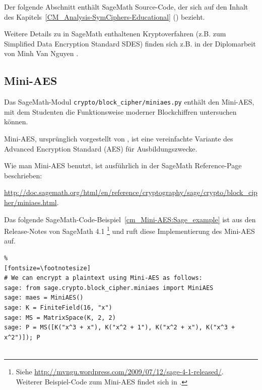 \begin{refsegment}
\noindent Der folgende Abschnitt enthält SageMath Source-Code, der sich auf den
Inhalt des Kapitels~\ref{CM_Analysis-SymCiphers-Educational}
(\glqq {}\grqq) bezieht.

Weitere Details zu in SageMath enthaltenen Kryptoverfahren (z.B. zum Simplified
Data Encryption Standard SDES) finden sich z.B. in der Diplomarbeit von Minh Van
Nguyen \cite{Nguyen2009b}.

\subsection{Mini-AES}
\label{CM_Sage_Mini-AES}

Das SageMath-Modul \texttt{crypto/block\_cipher/miniaes.py} enthält den Mini-AES, mit
dem Studenten die Funktionsweise moderner Blockchiffren untersuchen können.

Mini-AES, ursprünglich vorgestellt von \cite{Phan2002}, ist eine vereinfachte
Variante des Advanced Encryption Standard (AES) für Ausbildungszwecke.

Wie man Mini-AES benutzt, ist ausführlich in der SageMath Reference-Page beschrieben:
\begin{sloppypar} %
  \url{http://doc.sagemath.org/html/en/reference/cryptography/sage/crypto/block_cipher/miniaes.html}.
\end{sloppypar}

Das folgende SageMath-Code-Beispiel~\ref{cm_Mini-AES:Sage_example}
ist aus den Release-Notes von SageMath 4.1%
\footnote{
  Siehe \url{http://mvngu.wordpress.com/2009/07/12/sage-4-1-released/}.\\
  Weiterer Beispiel-Code zum Mini-AES findet sich in
  \cite[Kap. 6.5 und Anhang D]{Nguyen2009a}.
}
und ruft diese Implementierung des Mini-AES auf.


\begin{sagecode}
\begin{Verbatim}%
[fontsize=\footnotesize]
# We can encrypt a plaintext using Mini-AES as follows:
sage: from sage.crypto.block_cipher.miniaes import MiniAES
sage: maes = MiniAES()
sage: K = FiniteField(16, "x")
sage: MS = MatrixSpace(K, 2, 2)
sage: P = MS([K("x^3 + x"), K("x^2 + 1"), K("x^2 + x"), K("x^3 + x^2")]); P


\end{Verbatim}
\end{sagecode}
\end{refsegment}
